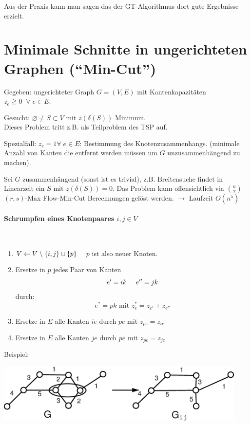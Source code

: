 Aus der Praxis kann man sagen das der GT-Algorithmus dort gute Ergebnisse
erzielt.

\section{Minimale Schnitte in ungerichteten Graphen ("`Min-Cut"')}

Gegeben: ungerichteter Graph $G=(V,E)$ mit Kantenkapazitäten $z_{e} \geqq 0
\; \; \forall \; e \in E$.

Gesucht: $\varnothing \neq S \subset V$ mit $z(\delta(S))$ Minimum.\\
Dieses Problem tritt z.B. als Teilproblem des TSP auf.

Spezialfall: $z_{e} = 1 \forall \; e \in E$: Bestimmung des
Knotenzusammenhangs. (minimale Anzahl von Kanten die entfernt werden müssen
um $G$ unzusammenhängend zu machen).

Sei $G$ zusammenhängend (sonst ist es trivial), z.B. Breitensuche findet in
Linearzeit ein $S$ mit $z(\delta(S))=0$. Das Problem kann
offensichtlich via ${n \choose 2}$ $(r,s)$-Max Flow-Min-Cut Berechnungen
gelöst werden. $\rightarrow$ Laufzeit $O(n^{5})$

\paragraph{Schrumpfen eines Knotenpaares $i,j \in V$} \mbox{} \\
\begin{enumerate}
\item $V \leftarrow V \;\backslash\; \{ i,j\} \cup \{p\}\; \; \; $ $p$ ist also 
neuer Knoten.
\item Ersetze in $p$ jedes Paar von Kanten
\[e'=i k \hspace{5mm} e''= j k\]
durch:
\[e^{\ast} = p k \mbox{ mit } z_{e}^{\ast} = z_{e'} + z_{e''}\]
\item Ersetze in $E$ alle Kanten $i e$ durch $p e$ mit $z_{p e} = z_{i e}$
\item Ersetze in $E$ alle Kanten $je$ durch $p e$ mit $z_{p e} = z_{je}$
\end{enumerate}
Beispiel:

\includegraphics[height=3cm]{bilder/3-0KnotenSchrumpf}

